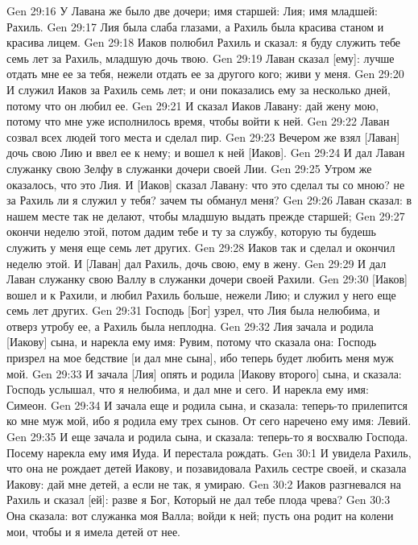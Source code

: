 \vs Gen 29:16 У Лавана же было две дочери; имя старшей: Лия; имя младшей: Рахиль.
\vs Gen 29:17 Лия была слаба глазами, а Рахиль была красива станом и красива лицем.
\vs Gen 29:18 Иаков полюбил Рахиль и сказал: я буду служить тебе семь лет за Рахиль, младшую дочь твою.
\vs Gen 29:19 Лаван сказал [ему]: лучше отдать мне ее за тебя, нежели отдать ее за другого кого; живи у меня.
\vs Gen 29:20 И служил Иаков за Рахиль семь лет; и они показались ему за несколько дней, потому что он любил ее.
\vs Gen 29:21 И сказал Иаков Лавану: дай жену мою, потому что мне уже исполнилось время, чтобы войти к ней.
\vs Gen 29:22 Лаван созвал всех людей того места и сделал пир.
\vs Gen 29:23 Вечером же взял [Лаван] дочь свою Лию и ввел ее к нему; и вошел к ней [Иаков].
\vs Gen 29:24 И дал Лаван служанку свою Зелфу в служанки дочери своей Лии.
\vs Gen 29:25 Утром же оказалось, что это Лия. И [Иаков] сказал Лавану: что это сделал ты со мною? не за Рахиль ли я служил у тебя? зачем ты обманул меня?
\vs Gen 29:26 Лаван сказал: в нашем месте так не делают, чтобы младшую выдать прежде старшей;
\vs Gen 29:27 окончи неделю этой, потом дадим тебе и ту за службу, которую ты будешь служить у меня еще семь лет других.
\vs Gen 29:28 Иаков так и сделал и окончил неделю этой. И [Лаван] дал Рахиль, дочь свою, ему в жену.
\vs Gen 29:29 И дал Лаван служанку свою Валлу в служанки дочери своей Рахили.
\vs Gen 29:30 [Иаков] вошел и к Рахили, и любил Рахиль больше, нежели Лию; и служил у него еще семь лет других.
\rsbpar\vs Gen 29:31 Господь [Бог] узрел, что Лия была нелюбима, и отверз утробу ее, а Рахиль была неплодна.
\vs Gen 29:32 Лия зачала и родила [Иакову] сына, и нарекла ему имя: Рувим, потому что сказала она: Господь призрел на мое бедствие [и дал мне сына], ибо теперь будет любить меня муж мой.
\vs Gen 29:33 И зачала [Лия] опять и родила [Иакову второго] сына, и сказала: Господь услышал, что я нелюбима, и дал мне и сего. И нарекла ему имя: Симеон.
\vs Gen 29:34 И зачала еще и родила сына, и сказала: теперь-то прилепится ко мне муж мой, ибо я родила ему трех сынов. От сего наречено ему имя: Левий.
\vs Gen 29:35 И еще зачала и родила сына, и сказала: теперь-то я восхвалю Господа. Посему нарекла ему имя Иуда. И перестала рождать.
\vs Gen 30:1 И увидела Рахиль, что она не рождает детей Иакову, и позавидовала Рахиль сестре своей, и сказала Иакову: дай мне детей, а если не так, я умираю.
\vs Gen 30:2 Иаков разгневался на Рахиль и сказал [ей]: разве я Бог, Который не дал тебе плода чрева?
\vs Gen 30:3 Она сказала: вот служанка моя Валла; войди к ней; пусть она родит на колени мои, чтобы и я имела детей от нее.
